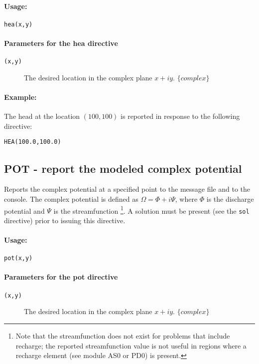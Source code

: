 \paragraph{Usage:}
\begin{verbatim}
hea(x,y)
\end{verbatim}

\paragraph{Parameters for the \textsf{hea} directive }
\begin{description}
\item [{\texttt{(x,y)}}] The desired location in the complex plane $x+iy$.
$\{complex\}$
\end{description}

\paragraph{Example:}

The head at the location $(100,100)$ is reported in response to the
following directive:
\begin{verbatim}
HEA(100.0,100.0)
\end{verbatim}

\subsection{\label{POT_directive}POT - report the modeled complex potential}

Reports the complex potential at a specified point to the message
file and to the console. The complex potential is defined as $\Omega=\Phi+i\Psi$,
where $\Phi$ is the discharge potential and $\Psi$ is the streamfunction%
\footnote{Note that the streamfunction does not exist for problems that include
recharge; the reported streamfunction value is not useful in regions
where a recharge element (see module AS0 or PD0) is present.%
}. A solution must be present (see the \texttt{sol} directive) prior
to issuing this directive.


\paragraph{Usage:}
\begin{verbatim}
pot(x,y)
\end{verbatim}

\paragraph{Parameters for the \textsf{pot} directive }
\begin{description}
\item [{\texttt{(x,y)}}] The desired location in the complex plane $x+iy$.
$\{complex\}$
\end{description}

